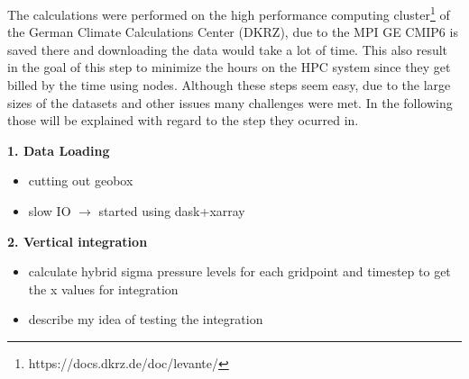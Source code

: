 The calculations were performed on the high performance computing cluster\footnote{https://docs.dkrz.de/doc/levante/} of the German Climate Calculations Center (DKRZ), due to the MPI GE CMIP6 is saved there and downloading the data would take a lot of time. 
This also result in the goal of this step to minimize the hours on the HPC system since they get billed by the time using nodes. 
Although these steps seem easy, due to the large sizes of the datasets and other issues many challenges were met. 
In the following those will be explained with regard to the step they ocurred in. 



\textbf{1. Data Loading}

\begin{itemize}
  \item cutting out geobox
  \item slow IO $\rightarrow$ started using dask+xarray 
\end{itemize}

\textbf{2. Vertical integration}

\begin{itemize}
  \item calculate hybrid  sigma pressure levels for each gridpoint and timestep to get the x values for integration
  \item describe my idea of testing the integration
  
\end{itemize}


%
%
%
%     
%
